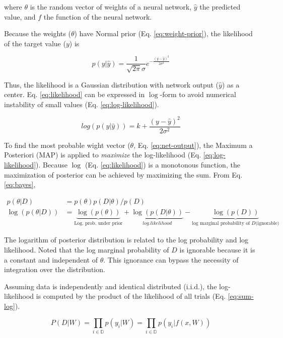 \documentclass{article}
\begin{document}
where $\theta$ is the random vector of weights of a neural network, $\hat{y}$ the predicted value, and $f$ the function of the neural network.

Because the weights ($\theta$) have Normal prior (Eq. \ref{eq:weight-prior}),  the likelihood of the target value ($y$) is 

\begin{equation}
    p(y|\hat{y}) = \frac{1}{\sqrt{2\pi}\sigma}e^{-\frac{(y-\hat{y})^2}{2\sigma^2}}
    \label{eq:likelihood}
\end{equation}

Thus, the likelihood is a Gaussian distribution with network output ($\hat{y}$) as a center. Eq. \ref{eq:likelihood} can be expressed in $\log$-form to avoid numerical instability of small values (Eq. \ref{eq:log-likelihood}).

\begin{equation}
    log (p(y|\hat{y})) = k + \frac{(y-\hat{y})^2}{2\sigma^2}
    \label{eq:log-likelihood}
\end{equation}


To find the most probable wight vector ($\theta$, Eq. \ref{eq:net-output}), the Maximum a Posteriori (MAP) is applied to \textit{maximize} the log-likelihood (Eq. \ref{eq:log-likelihood}). Because $\log$ (Eq. \ref{eq:likelihood}) is a monotonous function, the maximization of posterior can be achieved by maximizing the sum. From Eq. \ref{eq:bayes}, 

\begin{align}
    p(\theta|D) &= p(\theta) p(D|\theta) / p(D)\\
    \log(p(\theta|D)) &= \underbrace{\log(p(\theta))}_{\text{Log. prob. under prior}} + \underbrace{\log(p(D|\theta))}_{log. likelihood} - \underbrace{\log(p(D))}_{\text{log marginal probability of } D \text{(ignorable)}}\label{eq:log-sums}
\end{align}

The logarithm of posterior distribution is related to the log probability and log likelihood. Noted that the log marginal probability of $D$ is ignorable because it is a constant and independent of $\theta$. This ignorance can bypass the necessity of integration over the distribution.


Assuming data is independently and identical distributed (i.i.d.), the log-likelihood is computed by the product of the likelihood of all trials (Eq. \ref{eq:sum-log}).

\begin{equation}
    P(D|W) = \prod_{i\in \mathbb{D}} p(y_i | W) = \prod_{i \in \mathbb{D}} p(y_i | f(x, W))
\label{eq:sum-log}
\end{equation}
\end{document}
